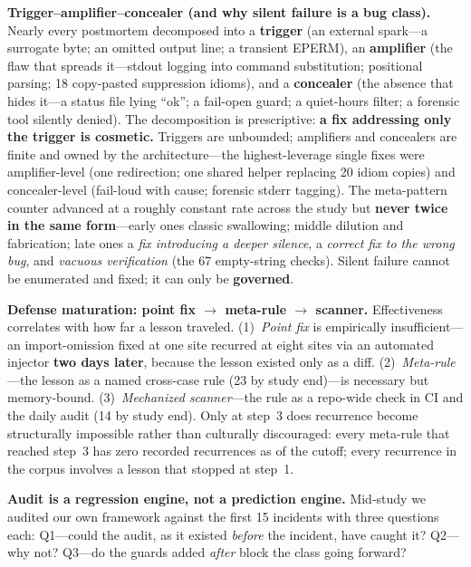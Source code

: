 \documentclass[conference]{IEEEtran}
\begin{document}
\textbf{Trigger--amplifier--concealer (and why silent failure is a bug
class).} Nearly every postmortem decomposed into a \textbf{trigger} (an
external spark---a surrogate byte; an omitted output line; a transient
EPERM), an \textbf{amplifier} (the flaw that spreads it---stdout logging
into command substitution; positional parsing; 18 copy-pasted suppression
idioms), and a \textbf{concealer} (the absence that hides it---a status
file lying ``ok''; a fail-open guard; a quiet-hours filter; a forensic
tool silently denied). The decomposition is prescriptive: \textbf{a fix
addressing only the trigger is cosmetic.} Triggers are unbounded;
amplifiers and concealers are finite and owned by the architecture---the
highest-leverage single fixes were amplifier-level (one redirection; one
shared helper replacing 20 idiom copies) and concealer-level (fail-loud
with cause; forensic stderr tagging). The meta-pattern counter advanced at
a roughly constant rate across the study but \textbf{never twice in the
same form}---early ones classic swallowing; middle dilution and
fabrication; late ones a \emph{fix introducing a deeper silence}, a
\emph{correct fix to the wrong bug}, and \emph{vacuous verification} (the
67 empty-string checks). Silent failure cannot be enumerated and fixed; it
can only be \textbf{governed}.

\textbf{Defense maturation: point fix $\to$ meta-rule $\to$
scanner.}\label{sec:maturation} Effectiveness correlates with how far a
lesson traveled. (1)~\emph{Point fix} is empirically insufficient---an
import-omission fixed at one site recurred at eight sites via an automated
injector \textbf{two days later}, because the lesson existed only as a
diff. (2)~\emph{Meta-rule}---the lesson as a named cross-case rule (23 by
study end)---is necessary but memory-bound. (3)~\emph{Mechanized
scanner}---the rule as a repo-wide check in CI and the daily audit (14 by
study end). Only at step~3 does recurrence become structurally impossible
rather than culturally discouraged: every meta-rule that reached step~3
has zero recorded recurrences as of the cutoff; every recurrence in the
corpus involves a lesson that stopped at step~1.

\textbf{Audit is a regression engine, not a prediction engine.} Mid-study
we audited our own framework against the first 15 incidents with three
questions each: Q1---could the audit, as it existed \emph{before} the
incident, have caught it? Q2---why not? Q3---do the guards added
\emph{after} block the class going forward?
\end{document}
